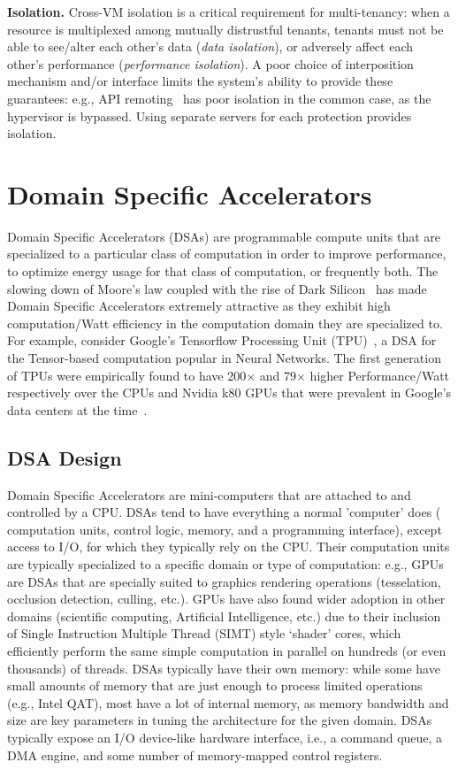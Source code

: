 \textbf{Isolation.}
Cross-VM isolation is a critical requirement for multi-tenancy:
when a resource is multiplexed among mutually distrustful tenants, tenants
must not be able to see/alter each other's data (\emph{data isolation}),
or adversely affect each other's performance (\emph{performance isolation}).
A poor choice of interposition mechanism and/or interface limits the system's
ability to provide these guarantees:
e.g., API remoting~\cite{bitfusion, rCUDA, mps} has poor isolation in the
common case, as the hypervisor is bypassed. Using separate servers for each
protection provides isolation.

\section{Domain Specific Accelerators}
Domain Specific Accelerators (DSAs) are programmable compute units that are
specialized to a particular class of computation in order to improve
performance, to optimize energy usage for that class of computation, or
frequently both.
The slowing down of Moore's law coupled with the rise of Dark Silicon~\cite{
Esmaeilzadeh2011-qv} has made Domain Specific Accelerators extremely attractive
as they exhibit high computation/Watt efficiency in the computation domain
they are specialized to. For example, consider Google's Tensorflow Processing
Unit (TPU)~\cite{TPU-CACM}, a DSA for the Tensor-based computation popular in
Neural Networks.
The first generation of TPUs were empirically found to have 200$\times$ and
79$\times$ higher Performance/Watt respectively over the CPUs and Nvidia k80
GPUs that were prevalent in Google's data centers at the time~\cite{TPU-ISCA}.

\subsection{DSA Design}
Domain Specific Accelerators are mini-computers that are attached to and
controlled by a CPU. DSAs tend to have everything a normal 'computer' does (
computation units, control logic, memory, and a programming interface), except
access to I/O, for which they typically rely on the CPU.
Their computation units are typically specialized to a specific domain or type
of computation: e.g., GPUs are DSAs that are specially suited to graphics
rendering operations (tesselation, occlusion detection, culling, etc.).
GPUs have also found wider adoption in other domains (scientific computing,
Artificial Intelligence, etc.) due to their inclusion of Single Instruction
Multiple Thread (SIMT) style `shader' cores, which efficiently perform
the same simple computation in parallel on hundreds (or even thousands) of
threads. DSAs typically have their own memory: while some have small amounts
of memory that are just enough to process limited operations (e.g., Intel
QAT), most have a lot of internal memory, as memory bandwidth and size are key
parameters in tuning the architecture for the given domain. DSAs typically
expose an I/O device-like hardware interface, i.e., a command queue, a DMA
engine, and some number of memory-mapped control registers.

